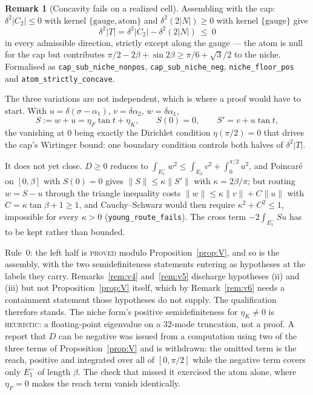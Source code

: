 \documentclass[11pt]{article}
\theoremstyle{definition}
\newtheorem{remark}[theorem]{Remark}
\begin{document}
\begin{remark}[Concavity fails on a realized cell]
Assembling with the cap: $\delta^2|C_2|\le0$ with kernel $\{\text{gauge},\text{atom}\}$ and
$\delta^2(2|N|)\ge0$ with kernel $\{\text{gauge}\}$ give
\[
  \delta^2|T|=\delta^2|C_2|-\delta^2(2|N|)\ \le\ 0
\]
in every admissible direction, strictly except along the gauge --- the atom is null for the
cap but contributes $\pi/2-2\beta+\sin2\beta\ge\pi/6+\sqrt3/2$ to the niche. Formalised as
\texttt{cap\_sub\_niche\_nonpos}, \texttt{cap\_sub\_niche\_neg},
\texttt{niche\_floor\_pos} and \texttt{atom\_strictly\_concave}.

The three variations are not independent, which is where a proof would have to start.
With $u=\delta(\sigma-\alpha_1)$, $v=\delta\alpha_2$, $w=\delta\alpha_1$,
\[
  S:=w+u=\eta_F\tan t+\eta_K,\qquad S(0)=0,\qquad S'=v+u\tan t ,
\]
the vanishing at $0$ being exactly the Dirichlet condition $\eta(\pi/2)=0$ that drives the
cap's Wirtinger bound: one boundary condition controls both halves of $\delta^2|T|$.

It does not yet close. $D\ge0$ reduces to
$\int_{E_1^-}w^2\le\int_{E_2}v^2+\int_0^{\pi/2}u^2$, and Poincar\'e on $[0,\beta]$ with
$S(0)=0$ gives $\|S\|\le\kappa\|S'\|$ with $\kappa=2\beta/\pi$; but routing $w=S-u$ through
the triangle inequality costs $\|w\|\le\kappa\|v\|+C\|u\|$ with $C=\kappa\tan\beta+1\ge1$,
and Cauchy--Schwarz would then require $\kappa^2+C^2\le1$, impossible for every $\kappa>0$
(\texttt{young\_route\_fails}). The cross term $-2\int_{E_1^-}Su$ has to be kept rather than
bounded.

Rule~0: the left half is \textsc{proved} modulo Proposition~\ref{prop:V}, and so is the
assembly, with the two semidefiniteness statements entering as hypotheses at the labels they
carry. Remarks~\ref{rem:v4} and~\ref{rem:v5} discharge hypotheses (ii) and (iii) but not
Proposition~\ref{prop:V} itself, which by Remark~\ref{rem:v6} needs a containment statement
those hypotheses do not supply. The qualification therefore stands. The niche form's positive semidefiniteness for $\eta_K\ne0$ is \textsc{heuristic}: a
floating-point eigenvalue on a $32$-mode truncation, not a proof. A
report that $D$ can be negative was issued from a computation using two of the three terms
of Proposition~\ref{prop:V} and is withdrawn: the omitted term is the reach, positive and
integrated over all of $[0,\pi/2]$ while the negative term covers only $E_1^-$ of length
$\beta$. The check that missed it exercised the atom alone, where $\eta_F=0$ makes the reach
term vanish identically.
\end{remark}
\end{document}
